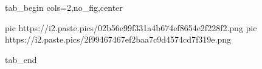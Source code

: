  
 
 
 
 


\ifcmt
  tab_begin cols=2,no_fig,center

     pic https://i2.paste.pics/02b56e99f331a4b674ef8654e2f228f2.png
		 pic https://i2.paste.pics/2f99467467ef2baa7c9d4574cd7f319e.png

  tab_end
\fi
